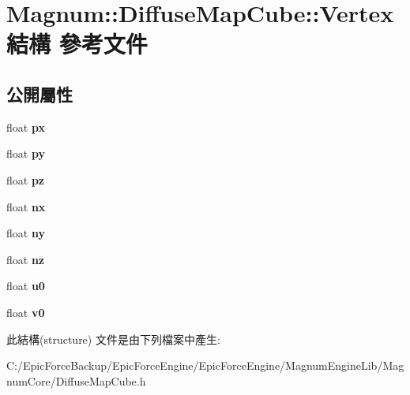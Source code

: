 \hypertarget{struct_magnum_1_1_diffuse_map_cube_1_1_vertex}{}\section{Magnum\+:\+:Diffuse\+Map\+Cube\+:\+:Vertex 結構 參考文件}
\label{struct_magnum_1_1_diffuse_map_cube_1_1_vertex}
\subsection*{公開屬性}
\begin{DoxyCompactItemize}
\item 
float {\bfseries px}\hypertarget{struct_magnum_1_1_diffuse_map_cube_1_1_vertex_aee9ab236f13ea976246fb7c67c32ce76}{}\label{struct_magnum_1_1_diffuse_map_cube_1_1_vertex_aee9ab236f13ea976246fb7c67c32ce76}

\item 
float {\bfseries py}\hypertarget{struct_magnum_1_1_diffuse_map_cube_1_1_vertex_a7304759dd0aeaa16e53dfe1995b9cdaf}{}\label{struct_magnum_1_1_diffuse_map_cube_1_1_vertex_a7304759dd0aeaa16e53dfe1995b9cdaf}

\item 
float {\bfseries pz}\hypertarget{struct_magnum_1_1_diffuse_map_cube_1_1_vertex_a7816855473f2271154da86eae7ee5405}{}\label{struct_magnum_1_1_diffuse_map_cube_1_1_vertex_a7816855473f2271154da86eae7ee5405}

\item 
float {\bfseries nx}\hypertarget{struct_magnum_1_1_diffuse_map_cube_1_1_vertex_a395484ab16628b8b3ecb98f50728e0c9}{}\label{struct_magnum_1_1_diffuse_map_cube_1_1_vertex_a395484ab16628b8b3ecb98f50728e0c9}

\item 
float {\bfseries ny}\hypertarget{struct_magnum_1_1_diffuse_map_cube_1_1_vertex_a9edb9e644bdbb183b52de5c2a6c4535f}{}\label{struct_magnum_1_1_diffuse_map_cube_1_1_vertex_a9edb9e644bdbb183b52de5c2a6c4535f}

\item 
float {\bfseries nz}\hypertarget{struct_magnum_1_1_diffuse_map_cube_1_1_vertex_a008f64a17fca78f2de3b17e9ced98158}{}\label{struct_magnum_1_1_diffuse_map_cube_1_1_vertex_a008f64a17fca78f2de3b17e9ced98158}

\item 
float {\bfseries u0}\hypertarget{struct_magnum_1_1_diffuse_map_cube_1_1_vertex_a49759e06a3344b652451cd4f3e23baed}{}\label{struct_magnum_1_1_diffuse_map_cube_1_1_vertex_a49759e06a3344b652451cd4f3e23baed}

\item 
float {\bfseries v0}\hypertarget{struct_magnum_1_1_diffuse_map_cube_1_1_vertex_a2e0d3218db9d18504d97c67ef08be6df}{}\label{struct_magnum_1_1_diffuse_map_cube_1_1_vertex_a2e0d3218db9d18504d97c67ef08be6df}

\end{DoxyCompactItemize}


此結構(structure) 文件是由下列檔案中產生\+:\begin{DoxyCompactItemize}
\item 
C\+:/\+Epic\+Force\+Backup/\+Epic\+Force\+Engine/\+Epic\+Force\+Engine/\+Magnum\+Engine\+Lib/\+Magnum\+Core/Diffuse\+Map\+Cube.\+h\end{DoxyCompactItemize}
